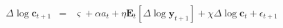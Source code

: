 \begin{eqnarray}
\Delta \log \mathbf{c}_{t+1} & = & \varsigma+{\alpha} a_{t} + \eta \mathbf{E}_{t}[\Delta \log \mathbf{y}_{t+1}] + \chi \Delta \log \mathbf{c}_{t} + \epsilon_{t+1} \label{eq:microEuler}  
\end{eqnarray}
